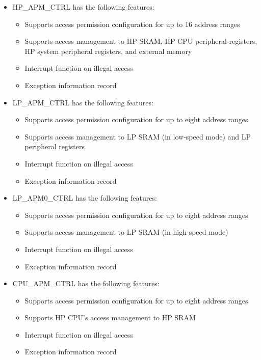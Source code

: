 \documentclass[main\_\_EN.tex]{subfiles}
\begin{document}
\begin{itemize}
    \item HP\_APM\_CTRL has the following features:
        \begin{itemize}
        \item Supports access permission configuration for up to 16 address ranges
        \item Supports access management to HP SRAM, HP CPU peripheral registers, HP system peripheral registers, and external memory
        \item Interrupt function on illegal access
        \item Exception information record
        \end{itemize}
    \item LP\_APM\_CTRL has the following features:
        \begin{itemize}
        \item Supports access permission configuration for up to eight address ranges
        \item Supports access management to LP SRAM (in low-speed mode) and LP peripheral registers
        \item Interrupt function on illegal access
        \item Exception information record
        \end{itemize}
    \item LP\_APM0\_CTRL has the following features:
        \begin{itemize}
        \item Supports access permission configuration for up to eight address ranges
        \item Supports access management to LP SRAM (in high-speed mode)
        \item Interrupt function on illegal access
        \item Exception information record
        \end{itemize}
    \item CPU\_APM\_CTRL has the following features:
        \begin{itemize}
        \item Supports access permission configuration for up to eight address ranges
        \item Supports HP CPU's access management to HP SRAM
        \item Interrupt function on illegal access
        \item Exception information record
        \end{itemize}
\end{itemize}
\end{document}
